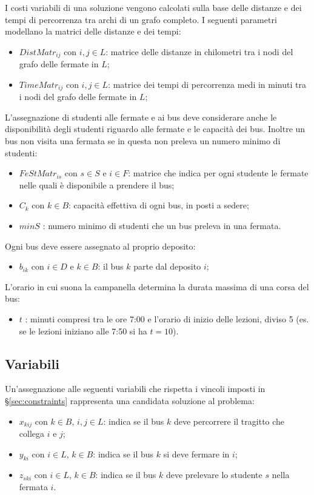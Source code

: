 I costi variabili di una soluzione vengono calcolati sulla base delle distanze e dei tempi di percorrenza tra archi di un grafo completo. I seguenti parametri modellano la matrici delle distanze e dei tempi:
\begin{itemize}
  \item $DistMatr_{ij}$ con $i,j \in L$: matrice delle distanze in chilometri tra i nodi del grafo delle fermate in $L$;
  \item $TimeMatr_{ij}$ con $i,j \in L$: matrice dei tempi di percorrenza medi in minuti tra i nodi del grafo delle fermate in $L$;
\end{itemize}
L'assegnazione di studenti alle fermate e ai bus deve considerare anche le disponibilità degli studenti riguardo alle fermate e le capacità dei bus. Inoltre un bus non visita una fermata se in questa non preleva un numero minimo di studenti:
\begin{itemize}
\item $FeStMatr_{is}$ con $s \in S$ e $i \in F$: matrice che indica per ogni studente le fermate nelle quali è disponibile a prendere il bus;
\item $C_k$ con $k \in B$: capacità effettiva di ogni bus, in posti a sedere;
\item $minS$ : numero minimo di studenti che un bus preleva in una fermata.
\end{itemize}
Ogni bus deve essere assegnato al proprio deposito:
\begin{itemize}
  \item $b_{ik}$ con $i \in D$ e $k \in B$: il bus $k$ parte dal deposito $i$;
\end{itemize}
L'orario in cui suona la campanella determina la durata massima di una corsa del bus:
\begin{itemize}
  \item $t$ : minuti compresi tra le ore 7:00 e l'orario di inizio delle lezioni, diviso 5 (es. se le lezioni iniziano alle 7:50 si ha $t = 10$).
\end{itemize}


\subsection{Variabili}
\label{subsec:var}
Un'assegnazione alle seguenti variabili che rispetta i vincoli imposti in §\ref{sec:constraints} rappresenta una candidata soluzione al problema:
\begin{itemize}
\item $x_{kij}$ con $k \in B$, $i,j \in L$: indica se il bus $k$ deve percorrere il tragitto che collega $i$ e $j$;
\item $y_{ki}$ con $i \in L$, $k \in B$: indica se il bus $k$ si deve fermare in $i$;
\item $z_{ski}$ con $i \in L$, $k \in B$: indica se il bus $k$ deve prelevare lo studente $s$ nella fermata $i$.
\end{itemize}


